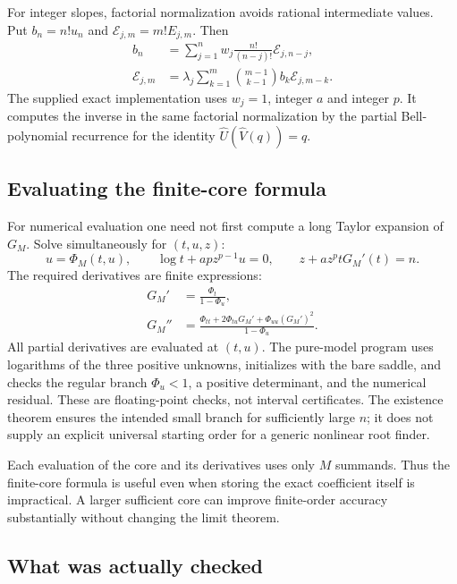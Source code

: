 \documentclass[11pt,a4paper]{article}
\numberwithin{equation}{section}
\theoremstyle{definition}
\theoremstyle{remark}
\newcommand{\Uhat}{\widehat U}\newcommand{\Vhat}{\widehat V}
\begin{document}
For integer slopes, factorial normalization avoids rational intermediate
values. Put $b_n=n!u_n$ and $\mathcal E_{j,m}=m!E_{j,m}$. Then
\begin{align}
 b_n&=\sum_{j=1}^n w_j\frac{n!}{(n-j)!}\mathcal E_{j,n-j},\\
 \mathcal E_{j,m}
 &=\lambda_j\sum_{k=1}^m\binom{m-1}{k-1}
                    b_k\mathcal E_{j,m-k}.
 \label{eq:integer-recurrence}
\end{align}
The supplied exact implementation uses $w_j=1$, integer $a$ and integer
$p$. It computes the inverse in the same factorial normalization by the
partial Bell-polynomial recurrence for the identity
$\Uhat(\Vhat(q))=q$.

\subsection{Evaluating the finite-core formula}

For numerical evaluation one need not first compute a long Taylor expansion
of $G_M$. Solve simultaneously for $(t,u,z)$:
\begin{equation}
 u=\Phi_M(t,u),\qquad
 \log t+apz^{p-1}u=0,\qquad
 z+a z^ptG_M'(t)=n.
 \label{eq:numeric-saddle}
\end{equation}
The required derivatives are finite expressions:
\begin{align}
 G_M'&=\frac{\Phi_t}{1-\Phi_u},\\
 G_M''&=\frac{\Phi_{tt}+2\Phi_{tu}G_M'
                              +\Phi_{uu}(G_M')^2}{1-\Phi_u}.
 \label{eq:core-derivatives}
\end{align}
All partial derivatives are evaluated at $(t,u)$. The pure-model program
uses logarithms of the three positive unknowns, initializes with the bare
saddle, and checks the regular branch $\Phi_u<1$, a positive determinant,
and the numerical residual. These are floating-point checks, not interval
certificates. The existence theorem ensures the intended small branch for
sufficiently large $n$; it does not supply an explicit universal starting
order for a generic nonlinear root finder.

Each evaluation of the core and its derivatives uses only $M$ summands.
Thus the finite-core formula is useful even when storing the exact
coefficient itself is impractical. A larger sufficient core can improve
finite-order accuracy substantially without changing the limit theorem.

\subsection{What was actually checked}
\end{document}
